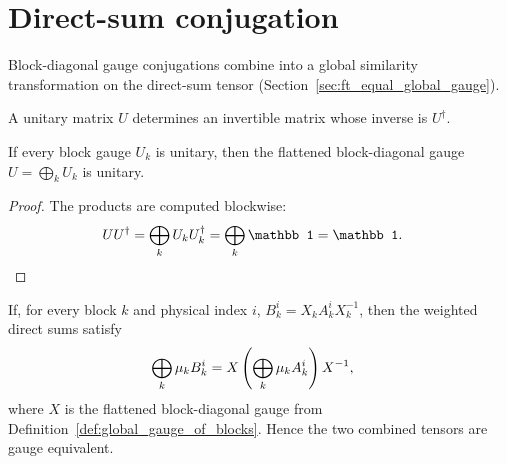 \section{Direct-sum conjugation}
\label{sec:app_ft_direct_sum_conjugation}

Block-diagonal gauge conjugations combine into a global similarity
transformation on the direct-sum tensor (Section~\ref{sec:ft_equal_global_gauge}).

\begin{definition}
    \label{def:unitary_gl}
    \leanok
    A unitary matrix $U$ determines an invertible matrix whose inverse is
    $U^\dagger$.
\end{definition}

\begin{lemma}
    \label{lem:unitary_global_gauge_of_blocks}
    \leanok
    If every block gauge $U_k$ is unitary, then the flattened block-diagonal
    gauge $U=\bigoplus_k U_k$ is unitary.
\end{lemma}
\begin{proof}\leanok
    The products are computed blockwise:
    \begin{align}
        U U^\dagger
         & = \bigoplus_k U_kU_k^\dagger
        = \bigoplus_k\mathbb 1
        = \mathbb 1.
        \notag
    \end{align}
\end{proof}

\begin{lemma}%
    \label{lem:tensor_from_blocks_globalGauge_conj}
    \leanok
    If, for every block $k$ and physical index $i$,
    $B_k^i=X_kA_k^iX_k^{-1}$, then the weighted direct sums satisfy
    \begin{align}
        \bigoplus_k \mu_k B_k^i
         & =
        X\left(\bigoplus_k \mu_k A_k^i\right)X^{-1},
        \notag
    \end{align}
    where $X$ is the flattened block-diagonal gauge from
    Definition~\ref{def:global_gauge_of_blocks}. Hence the two combined
    tensors are gauge equivalent.
\end{lemma}

